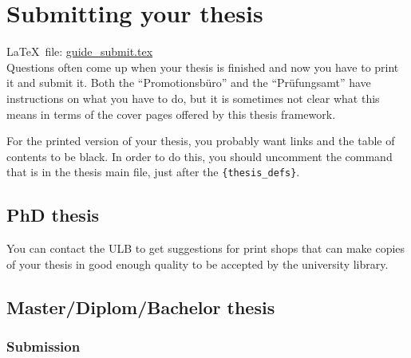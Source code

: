 \chapter{Submitting your thesis}%
\label{sec:submit}

\LaTeX\ file: \href{run:./guide_submit.tex}{guide\_submit.tex}\\[1ex]
\noindent
Questions often come up when your thesis is finished and now you have
to print it and submit it. Both the
\foreignquote{ngerman}{Promotionsbüro} and the
\foreignquote{ngerman}{Prüfungsamt} have instructions on what you have
to do, but it is sometimes not clear what this means in terms of the
cover pages offered by this thesis framework.

For the printed version of your thesis, you probably want
 links and the table of contents to be black. In
order to do this, you should uncomment the  command
that is in the thesis main file, just after the
\texttt{\{thesis\_defs\}}.


\section{PhD thesis}%
\label{sec:submit:phd}



You can contact the ULB to get suggestions for print
shops that can make copies of your thesis in good enough quality to be
accepted by the university library.


\section{Master/Diplom/Bachelor thesis}%
\label{sec:submit:other}

\subsection{Submission}

